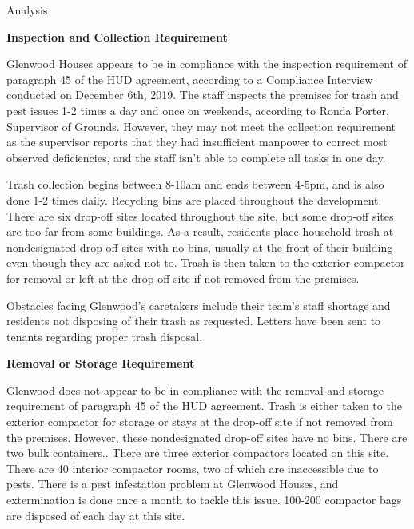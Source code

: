 Analysis

\textbf{Inspection and Collection Requirement}

Glenwood Houses appears to be in compliance with the inspection requirement of paragraph 45 of the HUD agreement, according to a Compliance Interview conducted on December 6th, 2019. The staff inspects the premises for trash and pest issues 1-2 times a day and once on weekends, according to Ronda Porter, Supervisor of Grounds. However, they may not meet  the collection requirement as the supervisor reports that they had insufficient manpower to correct most observed deficiencies, and the staff isn't able to complete all tasks in one day. 

Trash collection begins between 8-10am and ends between 4-5pm, and is also done 1-2 times daily. Recycling bins are placed throughout the development. There are six drop-off sites located throughout the site, but some drop-off sites are too far from some buildings. As a result, residents place household trash at nondesignated drop-off sites with no bins, usually at the front of their building even though they are asked not to. Trash is then taken to the exterior compactor for removal or left at the drop-off site if not removed from the premises. 

Obstacles facing Glenwood's caretakers include their team's staff shortage and residents not disposing of their trash as requested. Letters have been sent to tenants regarding proper trash disposal.

\textbf{Removal or Storage Requirement}

Glenwood does not appear to be in compliance with the removal and storage requirement of paragraph 45 of the HUD agreement. Trash is either taken to the exterior compactor for storage or stays at the drop-off site if not removed from the premises. However, these nondesignated drop-off sites have no bins. There are two bulk containers.. There are three exterior compactors located on this site. There are 40 interior compactor rooms, two of which are inaccessible due to pests. There is a pest infestation problem at Glenwood Houses, and extermination is done once a month to tackle this issue. 100-200 compactor bags are disposed of each day at this site. 